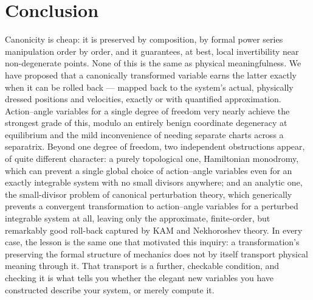\documentclass[11pt]{article}
\begin{document}
\section{Conclusion}

Canonicity is cheap: it is preserved by composition, by formal power series manipulation order by order, and it guarantees, at best, local invertibility near non-degenerate points. None of this is the same as physical meaningfulness. We have proposed that a canonically transformed variable earns the latter exactly when it can be rolled back --- mapped back to the system's actual, physically dressed positions and velocities, exactly or with quantified approximation. Action--angle variables for a single degree of freedom very nearly achieve the strongest grade of this, modulo an entirely benign coordinate degeneracy at equilibrium and the mild inconvenience of needing separate charts across a separatrix. Beyond one degree of freedom, two independent obstructions appear, of quite different character: a purely topological one, Hamiltonian monodromy, which can prevent a single global choice of action--angle variables even for an exactly integrable system with no small divisors anywhere; and an analytic one, the small-divisor problem of canonical perturbation theory, which generically prevents a convergent transformation to action--angle variables for a perturbed integrable system at all, leaving only the approximate, finite-order, but remarkably good roll-back captured by KAM and Nekhoroshev theory. In every case, the lesson is the same one that motivated this inquiry: a transformation's preserving the formal structure of mechanics does not by itself transport physical meaning through it. That transport is a further, checkable condition, and checking it is what tells you whether the elegant new variables you have constructed describe your system, or merely compute it.
\end{document}
